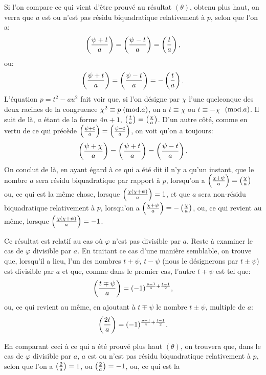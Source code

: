 \noindent
Si l'on compare ce qui vient d'être prouvé au résultat $(\theta)$, obtenu plus haut,
on verra que $a$ est ou n'est pas résidu biquadratique relativement à $p$, selon
que l'on a:
\[
\left(\frac{\psi+t}{a}\right)=\left(\frac{\psi-t}{a}\right)=\left(\frac{t}{a}\right),
\]
ou:
\[
\left(\frac{\psi+t}{a}\right)=\left(\frac{\psi-t}{a}\right)=-\left(\frac{t}{a}\right).
\]
L'équation $p=t^2-au^2$ fait voir que, si l'on désigne par $\chi$ l'une quelconque
des deux racines de la congruence $\chi^2\equiv p\;(\mathrm{mod}.a)$, on a $t\equiv\chi$ ou $t\equiv-\chi$
$\;(\mathrm{mod}.a)$. Il suit de là, $a$ étant de la forme $4n+1$, $\left(\frac{t}{a}\right)=\left(\frac{\chi}{a}\right)$.
D'un autre côté, comme en vertu de ce qui précède $\left(\frac{\psi+t}{a}\right)=\left(\frac{\psi-t}{a}\right)$, on voit qu'on
a toujours:
\[
\left(\frac{\psi+\chi}{a}\right)=\left(\frac{\psi+t}{a}\right)=\left(\frac{\psi-t}{a}\right).
\]
On conclut de là, en ayant égard à ce qui a été dit il n'y a qu'un instant,
que le nombre $a$ sera résidu biquadratique par rapport à $p$, lorsqu'on a
$\left(\frac{\chi+\psi}{a}\right)=\left(\frac{\chi}{a}\right)$ ou, ce qui est la même chose, lorsque
$\left(\frac{\chi(\chi+\psi)}{a}\right)=1$, et que
$a$ sera non-résidu biquadratique relativement à $p$, lorsqu'on a $\left(\frac{\chi+\psi}{a}\right)=-\left(\frac{\chi}{a}\right)$,
ou, ce qui revient au même, lorsque $\left(\frac{\chi(\chi+\psi)}{a}\right)=-1$.
\par\indent
Ce résultat est relatif au cas où $\varphi$ n'est pas divisible par $a$. Reste à
examiner le cas de $\varphi$ divisible par $a$. En traitant ce cas d'une manière
semblable, on trouve que, lorsqu'il a lieu, l'un des nombres $t+\psi$, $t-\psi$ (nous le
désignerons par $t\pm\psi$) est divisible par $a$ et que, comme dans le premier cas,
l'autre $t\mp\psi$ est tel que:
\[
\left(\frac{t\mp\psi}{a}\right)=(-1)^{\frac{p-1}{4}+\frac{t-1}{2}},
\]
ou, ce qui revient au même, en ajoutant à $t\mp\psi$ le nombre $t\pm\psi$, multiple de $a$:
\[
\left(\frac{2t}{a}\right)=(-1)^{\frac{p-1}{4}+\frac{t-1}{2}}.
\]
\par\indent
En comparant ceci à ce qui a été prouvé plus haut $(\theta)$, on trouvera
que, dans le cas de $\varphi$ divisible par $a$, $a$ est ou n'est pas résidu biquadratique
relativement à $p$, selon que l'on a $\left(\frac{2}{a}\right)=1$, ou $\left(\frac{2}{a}\right)=-1$, ou, ce qui est la
